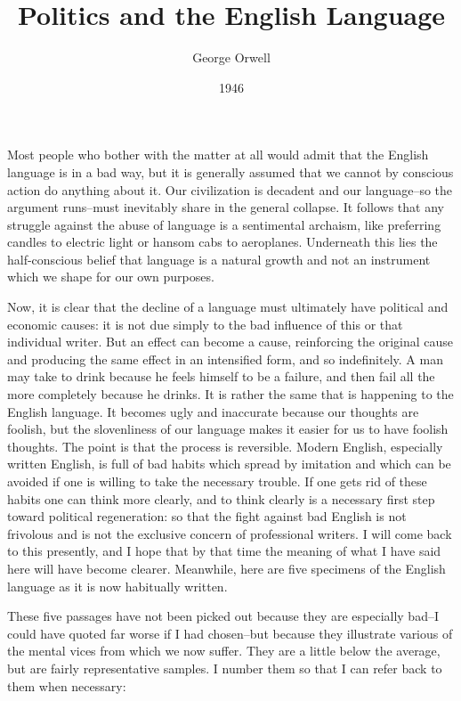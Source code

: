 \documentclass[a4paper]{article}
\title{Politics and the English Language}
\author{George Orwell}
\date{1946}
\makeatletter
\renewcommand{\maketitle}{\bgroup\setlength{\parindent}{0pt}
\begin{flushleft}
  \huge{\textbf{\@title}}
  
  \vspace{0.2cm}
  
  \large{\@author}
  
  \vspace{0.1cm}
  
  \normalsize{\@date}
\end{flushleft}\egroup
}
\makeatother
\begin{document}
\maketitle

\vspace{0.4cm}

Most people who bother with the matter at all would admit that the English language is in a bad way, but it is generally assumed that we cannot by conscious action do anything about it. Our civilization is decadent and our language--so the argument runs--must inevitably share in the general collapse. It follows that any struggle against the abuse of language is a sentimental archaism, like preferring candles to electric light or hansom cabs to aeroplanes. Underneath this lies the half-conscious belief that language is a natural growth and not an instrument which we shape for our own purposes.

Now, it is clear that the decline of a language must ultimately have political and economic causes: it is not due simply to the bad influence of this or that individual writer. But an effect can become a cause, reinforcing the original cause and producing the same effect in an intensified form, and so indefinitely. A man may take to drink because he feels himself to be a failure, and then fail all the more completely because he drinks. It is rather the same that is happening to the English language. It becomes ugly and inaccurate because our thoughts are foolish, but the slovenliness of our language makes it easier for us to have foolish thoughts. The point is that the process is reversible. Modern English, especially written English, is full of bad habits which spread by imitation and which can be avoided if one is willing to take the necessary trouble. If one gets rid of these habits one can think more clearly, and to think clearly is a necessary first step toward political regeneration: so that the fight against bad English is not frivolous and is not the exclusive concern of professional writers. I will come back to this presently, and I hope that by that time the meaning of what I have said here will have become clearer. Meanwhile, here are five specimens of the English language as it is now habitually written. 

These five passages have not been picked out because they are especially bad--I could have quoted far worse if I had chosen--but because they illustrate various of the mental vices from which we now suffer. They are a little below the average, but are fairly representative samples. I number them so that I can refer back to them when necessary: 
\end{document}
